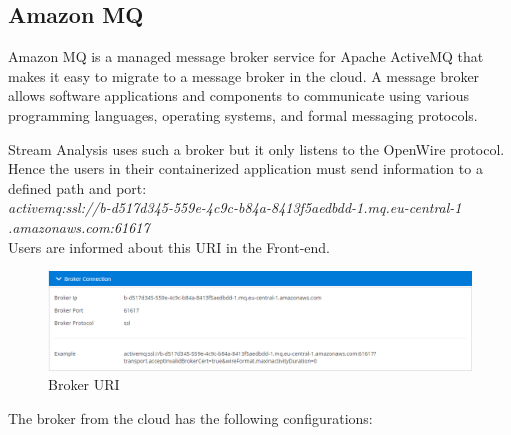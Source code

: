 \subsection{Amazon MQ}
\label{chap:04:03:04}

Amazon MQ is a managed message broker service for Apache ActiveMQ that makes it easy to migrate to a message broker in the cloud. A message broker allows software applications and components to communicate using various programming languages, operating systems, and formal messaging protocols.\cite{amazon-mq}

Stream Analysis uses such a broker but it only listens to the OpenWire protocol. Hence the users in their containerized application must send information to a defined path and port:\\ 

\textit{activemq:ssl://b-d517d345-559e-4c9c-b84a-8413f5aedbdd-1.mq.eu-central-1
	.amazonaws.com:61617}\\

Users are informed about this URI in the Front-end.

\begin{figure}[h]
	\centering
	\includegraphics[width=1\linewidth]{./images/webapp/broker.PNG}
	\caption{Broker URI}
	\label{fig:broker}
\end{figure}

The broker from the cloud has the following configurations:

